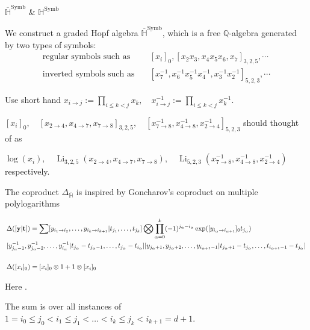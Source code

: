 \documentclass[8pt]{beamer}
\DeclareMathOperator{\Symb}{Symb}
\DeclareMathOperator{\Li}{Li}
\theoremstyle{definition}
\theoremstyle{remark}
\begin{document}
\begin{frame}[t]{$\overline{\mathbb H}^{\Symb}$ \& $\mathbb H^{\Symb}$}
\begin{definition}
We construct a graded Hopf algebra $\overline{\mathbb H}^{\Symb}$, which is a free $\mathbb Q$-algebra generated by two types of symbols:
\begin{align*}
\text{regular symbols such as}&\quad [x_i]_0, [x_2x_3, x_4x_5x_6, x_7]_{3,2,5}, \cdots\\
\text{inverted symbols such as}&\quad [x_7^{-1}, x_6^{-1}x_5^{-1}x_4^{-1}, x_3^{-1}x_2^{-1}]_{5,2,3}, \cdots
\end{align*}
\end{definition}
Use short hand $x_{i\to j}:=\prod_{i\leq k<j}x_k,\quad x^{-1}_{i\to j}:=\prod_{i\leq k<j}x_k^{-1}$.

$[x_{i}]_0,\quad [x_{2\to 4},x_{4\to7},x_{7\to8}]_{3,2,5},\quad [x_{7\to8}^{-1},x_{4\to8}^{-1},x_{2\to 4}^{-1}]_{5,2,3}$  should thought of as

$\log(x_i),\quad\Li_{3,2,5}\left(x_{2\to 4},x_{4\to7},x_{7\to8}\right),\quad\Li_{5,2,3}\left(x_{7\to8}^{-1},x_{4\to8}^{-1},x_{2\to 4}^{-1}\right)$ respectively.
\vspace{10pt}

The coproduct $\Delta_{\overline{\mathbb H}}$ is inspired by Goncharov's coproduct on multiple polylogarithms

\begin{equation}
\scalebox{.8}{$
\begin{aligned}
&\Delta([\mathbf y|\mathbf t])=\sum[y_{i_1\to i_2},\dots,y_{i_k\to i_{k+1}}|t_{j_1},\dots ,t_{j_k}]\bigotimes\prod_{\alpha=0}^k(-1)^{j_\alpha-i_\alpha}\exp([y_{i_\alpha\to i_{\alpha+1}}]_0t_{j_\alpha})\\
&[y_{j_\alpha-1}^{-1},y_{j_\alpha-2}^{-1},\dots,y_{i_\alpha}^{-1}|t_{j_\alpha}-t_{j_\alpha-1},\dots, t_{j_\alpha}-t_{i_\alpha}][y_{j_\alpha+1},y_{j_\alpha+2},\dots,y_{i_{\alpha+1}-1}|t_{j_\alpha+1}-t_{j_\alpha},\dots,t_{i_{\alpha+1}-1}-t_{j_\alpha}]\\
&\\
&\Delta([x_{i}]_0)=[x_{i}]_0\otimes 1+1\otimes [x_{i}]_0
\end{aligned}
$}
\end{equation}

Here . 

The sum is over all instances of $1=i_0\leq j_0<i_1\leq j_1<\dots <i_k\leq j_k<i_{k+1}=d+1$.
\end{frame}
\end{document}
